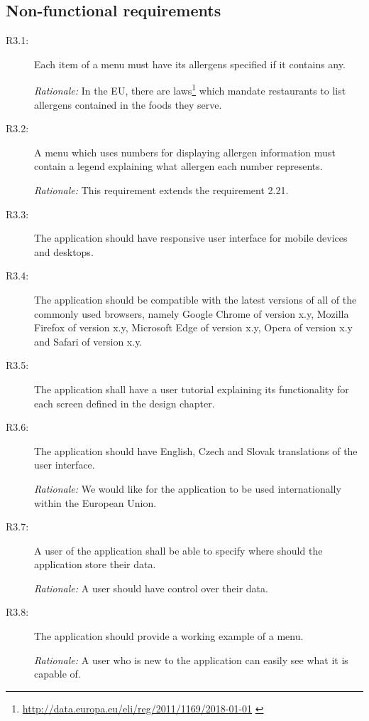 \subsection{Non-functional requirements}

\begin{description}
    \item [R3.1:] Each item of a menu must have its allergens specified if it contains any.
    
    \emph{Rationale:} In the EU, there are laws\footnote{\url{http://data.europa.eu/eli/reg/2011/1169/2018-01-01}  \label{fnlabel}} which mandate restaurants to list allergens contained in the foods they serve.
    \item [R3.2:] A menu which uses numbers for displaying allergen information must contain a legend explaining what allergen each number represents.

    \emph{Rationale:} This requirement extends the requirement 2.21.
    \item [R3.3:] The application should have responsive user interface for mobile devices and desktops.
    \item [R3.4:] The application should be compatible with the latest versions of all of the commonly used browsers, namely Google Chrome of version x.y, Mozilla Firefox of version x.y, Microsoft Edge of version x.y, Opera of version x.y and Safari of version x.y.
    \item [R3.5:] The application shall have a user tutorial explaining its functionality for each screen defined in the design chapter.
    \item [R3.6:] The application should have English, Czech and Slovak translations of the user interface.

    \emph{Rationale:} We would like for the application to be used internationally within the European Union.
    \item [R3.7:] A user of the application shall be able to specify where should the application store their data.

    \emph{Rationale:} A user should have control over their data.
    \item [R3.8:] The application should provide a working example of a menu.

    \emph{Rationale:} A user who is new to the application can easily see what it is capable of.
\end{description}

\vspace*{\fill}